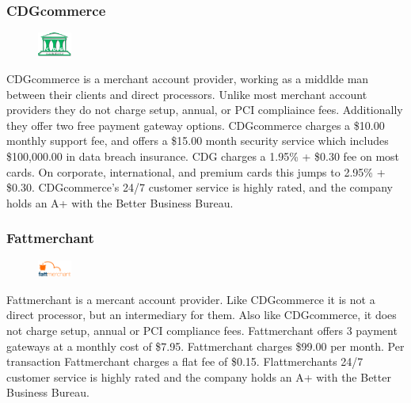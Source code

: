 \documentclass[letterpaper]{article}
\begin{document}
      \subsubsection{CDGcommerce}
        \begin{figure}
          \centering
          \includegraphics[width=0.1\textwidth]{cdgcommerce-logo}
        \end{figure}
        CDGcommerce is a merchant account provider, working as a middlde man between their clients and direct processors.
        Unlike most merchant account providers they do not charge setup, annual, or PCI compliaince fees. Additionally they
        offer two free payment gateway options. CDGcommerce charges a \$10.00 monthly support fee, and offers a \$15.00 month security service which includes
        \$100,000.00 in data breach insurance. CDG charges a 1.95\% + \$0.30 fee on most cards. On corporate, international, and premium cards this jumps to
        2.95\% + \$0.30. CDGcommerce's 24/7 customer service is highly rated, and the company holds an A+ with the Better Business Bureau.
      \subsubsection{Fattmerchant}
      \begin{figure}
        \centering
        \includegraphics[width=0.1\textwidth]{fattmerchant}
      \end{figure}
        Fattmerchant is a mercant account provider. Like CDGcommerce it is not a direct processor, but an intermediary for them.
        Also like CDGcommerce, it does not charge setup, annual or PCI compliance fees. Fattmerchant offers 3 payment gateways at a monthly cost of \$7.95.
        Fattmerchant charges \$99.00 per month. Per transaction Fattmerchant charges a flat fee of \$0.15. Flattmerchants 24/7 customer service is highly rated
        and the company holds an A+ with the Better Business Bureau.
\end{document}
